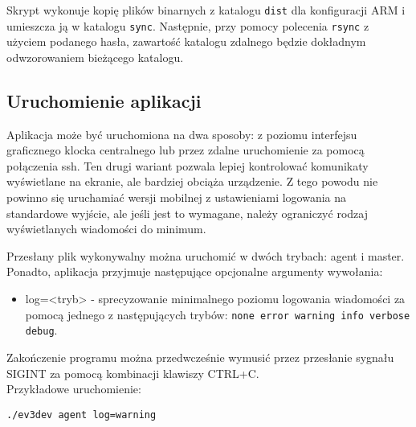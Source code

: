 Skrypt wykonuje kopię plików binarnych z katalogu {\tt dist} dla konfiguracji ARM i umieszcza ją w katalogu {\tt sync}. Następnie, przy pomocy polecenia {\tt rsync} z użyciem podanego hasła, zawartość katalogu zdalnego będzie dokładnym odwzorowaniem bieżącego katalogu.

\subsection{Uruchomienie aplikacji}

Aplikacja może być uruchomiona na dwa sposoby: z poziomu interfejsu graficznego klocka centralnego lub przez zdalne uruchomienie za pomocą połączenia ssh. Ten drugi wariant pozwala lepiej kontrolować komunikaty wyświetlane na ekranie, ale bardziej obciąża urządzenie. Z tego powodu nie powinno się uruchamiać wersji mobilnej z ustawieniami logowania na standardowe wyjście, ale jeśli jest to wymagane, należy ograniczyć rodzaj wyświetlanych wiadomości do minimum.

Przesłany plik wykonywalny można uruchomić w dwóch trybach: agent i master. Ponadto, aplikacja przyjmuje następujące opcjonalne argumenty wywołania:
\begin{itemize}
    \item log=<tryb> - sprecyzowanie minimalnego poziomu logowania wiadomości za pomocą jednego z następujących trybów: {\tt none error warning info verbose debug}.
\end{itemize}

Zakończenie programu można przedwcześnie wymusić przez przesłanie sygnału SIGINT za pomocą kombinacji klawiszy CTRL+C.\\

Przykładowe uruchomienie:
\begin{center}
    {\tt ./ev3dev agent log=warning}
\end{center}

